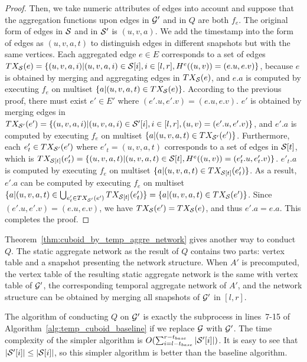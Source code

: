 \documentclass[10pt,journal,compsoc]{IEEEtran}
\begin{document}
{\begin{proof}
	Then, we take numeric attributes of edges into account and suppose that the aggregation functions upon edges in $ \mathcal{G}' $ and in $ Q $ are both $ f_e $. The original form of edges in $ \mathcal{S} $ and in $ \mathcal{S}' $ is $ (u,v,a) $. We add the timestamp into the form of edges as $ (u,v,a,t) $ to distinguish edges in different snapshots but with the same vertices. Each aggregated edge $ e\in E $ corresponds to a set of edges $TX_{\mathcal{S}}(e)=\{(u,v,a,i)|(u,v,a,i)\in \mathcal{S}[i],i\in [l,r],H^e((u,v))=(e.u,e.v)\} $, because $ e $ is obtained by merging and aggregating edges in $ TX_{\mathcal{S}}(e) $, and $ e.a $ is computed by executing $ f_e $ on multiset $ \{a|(u,v,a,t)\in TX_{\mathcal{S}}(e)\} $. According to the previous proof, there must exist $ e' \in E'$ where $(e'.u,e'.v)=(e.u,e.v) $. $ e' $ is obtained by merging edges in $TX_{\mathcal{S}'}(e')= \{(u,v,a,i)|(u,v,a,i) \in \mathcal{S}'[i],i \in [l,r],(u,v)=(e'.u,e'.v)\} $, and $ e'.a $ is computed by executing $ f_e $ on multiset $ \{a|(u,v,a,t)\in TX_{\mathcal{S}'}(e')\} $. Furthermore, each $ e'_t\in TX_{\mathcal{S}'}(e') $ where $ e'_t=(u,v,a,t) $ corresponds to a set of edges in $ \mathcal{S}[t] $, which is $TX_{\mathcal{S}[t]}(e'_t)= \{(u,v,a,t)|(u,v,a,t)\in \mathcal{S}[t],H^e((u,v))=(e'_t.u,e'_t.v)\} $. $ e'_t.a $ is computed by executing $ f_e $ on multiset $ \{a|(u,v,a,t)\in TX_{\mathcal{S}[t]}(e'_t)\} $. As a result, $ e'.a $ can be computed by executing $ f_e $ on multiset $ \{a|(u,v,a,t)\in \bigcup_{e'_t\in TX_{\mathcal{S}'}(e')}TX_{\mathcal{S}[t]}(e'_t)\}=\{a|(u,v,a,t)\in TX_{\mathcal{S}}(e')\} $. Since $ (e'.u,e'.v)=(e.u,e.v) $, we have $ TX_{\mathcal{S}}(e')=TX_{\mathcal{S}}(e) $, and thus $ e'.a=e.a $. This completes the proof. %
\end{proof}
}

Theorem~\ref{thm:cuboid_by_temp_aggre_network} gives another way to conduct $ Q $. The static aggregate network as the result of $ Q $ contains two parts: vertex table and a snapshot presenting the network structure. When $ A' $ is precomputed, the vertex table of the resulting static aggregate network is the same with vertex table of $ \mathcal{G}' $, the corresponding temporal aggregate network of $ A' $, and the network structure can be obtained by merging all snapshots of $ \mathcal{G}' $ in $ [l,r] $.

The algorithm of conducting $ Q $ on $ \mathcal{G}' $ is exactly the subprocess in lines~7-15 of Algorithm~\ref{alg:temp_cuboid_baseline} if we replace $ \mathcal{G} $ with $ \mathcal{G}' $. The time complexity of the simpler algorithm is $ O(\sum_{i=l-t_{base}}^{r-t_{base}}|\mathcal{S}'[i]|) $. It is easy to see that $ |\mathcal{S}'[i]| \leq |\mathcal{S}[i]| $, so this simpler algorithm is better than the baseline algorithm.
\end{document}

